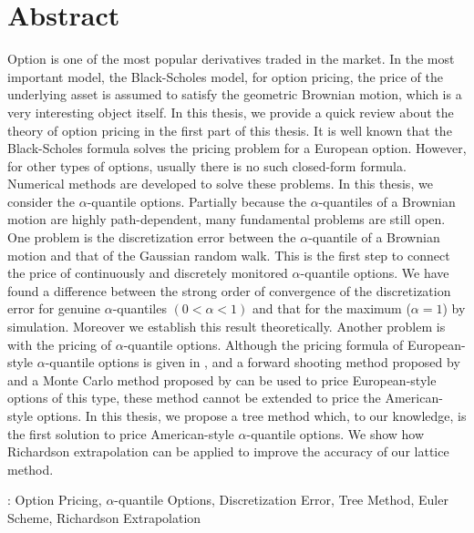 \chapter{Abstract}
Option is one of the most popular derivatives traded in the market. 
In the most important model, the Black-Scholes model, for option pricing, the price of the underlying asset is assumed to satisfy the geometric Brownian motion, which is a very interesting object itself. In this thesis, we provide a quick review about the theory of option pricing in the first part of this thesis. It is well known that the Black-Scholes formula solves the pricing problem for a European option. However, for other types of options, usually there is no such closed-form formula. Numerical methods are developed to solve these problems. In this thesis, we consider the $\alpha$-quantile options. Partially because the $\alpha$-quantiles of a Brownian motion are highly path-dependent, many fundamental problems are still open. One problem is the discretization error between the $\alpha$-quantile of a Brownian motion and that of the Gaussian random walk. This is the first step to connect the price of continuously and discretely monitored $\alpha$-quantile options. We have found a difference between the strong order of convergence of the discretization error for genuine $\alpha$-quantiles $(0< \alpha < 1)$ and that for the maximum ($\alpha=1$) by simulation. Moreover we establish this result theoretically. Another problem is with the pricing of $\alpha$-quantile options. Although the pricing formula of European-style $\alpha$-quantile options is given in \cite{Dassios1995}, and a forward shooting method proposed by \cite{Kwok2001} and a Monte Carlo method proposed by \cite{Laura2001} can be used to price European-style options of this type, these method cannot be extended to price the American-style options. In this thesis, we propose a tree method which, to our knowledge, is the first solution to price American-style $\alpha$-quantile options. We show how Richardson extrapolation can be applied to improve the accuracy of our lattice method. 
\vspace{1cm}

: Option Pricing, $\alpha$-quantile Options, Discretization Error, Tree Method, Euler Scheme, Richardson Extrapolation
